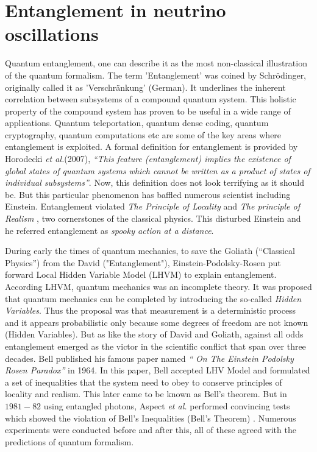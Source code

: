 \documentclass[12pt,a4paper]{report}
\begin{document}
\chapter{Entanglement in neutrino oscillations}\label{sec3}
Quantum entanglement, one can describe it as the most non-classical illustration of the quantum formalism. The term 'Entanglement' was coined by Schr\"{o}dinger, originally called it as 'Verschr\"{a}nkung' (German). It underlines the inherent correlation between subsystems of a compound quantum system. This holistic property of the compound system has proven to be useful in a wide range of applications. Quantum teleportation, quantum dense coding, quantum cryptography, quantum computations etc are some of the key areas where entanglement is exploited.  A formal definition for entanglement is provided by Horodecki \emph{et al.}(2007), \emph{“This feature (entanglement) implies the existence of global states of quantum systems which cannot be written as a product of states of individual subsystems”}. Now, this definition does not look terrifying as it should be. But this particular phenomenon has baffled numerous scientist including Einstein. Entanglement violated \emph{The Principle of Locality}  and  \emph{The principle of Realism} \cite{Benenti}, two cornerstones of the classical physics. This disturbed Einstein and he referred entanglement as \emph{spooky action at a distance}.\par During early the times of quantum mechanics, to save the Goliath (“Classical Physics”) from the David ("Entanglement"), Einstein-Podolsky-Rosen put forward Local Hidden Variable Model (LHVM) \cite{epr} to explain entanglement. According LHVM, quantum mechanics was an incomplete theory. It was proposed that quantum mechanics can be completed by introducing the so-called \emph{Hidden Variables}. Thus the proposal was that measurement is a deterministic process and it appears probabilistic only because some degrees of freedom are not known (Hidden Variables).
But as like the story of David and Goliath, against all odds entanglement emerged as the victor in the scientific conflict that span over three decades. Bell published his famous paper named \emph{“ On The Einstein Podolsky Rosen Paradox”} \cite{bell} in 1964. In this paper, Bell accepted LHV Model and formulated a set of inequalities that the system need to obey to conserve principles of locality and realism. This later came to be known as Bell’s theorem. But in $1981-82$ using entangled photons, Aspect \emph{et al.} performed convincing tests which showed the violation of Bell’s Inequalities (Bell’s Theorem) \cite{aspect82a}\cite{aspect82b}. Numerous experiments were conducted before and after this, all of these agreed with the predictions of quantum formalism.
\end{document}
